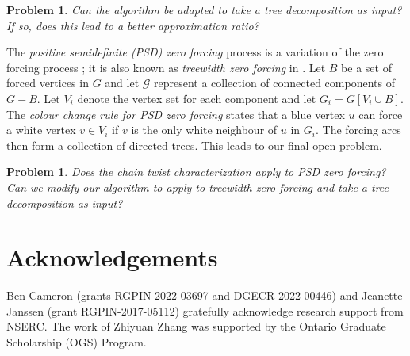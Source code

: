 \documentclass[12pt]{amsart}
\theoremstyle{plain}
\newtheorem{problem}[theorem]{Problem}
\theoremstyle{definition}
\begin{document}
\begin{problem}
  Can the algorithm be adapted to take a tree decomposition as input? If so, does this lead to a better approximation ratio?  
\end{problem}

The {\em positive semidefinite (PSD) zero forcing} process is a variation of the zero forcing process \cite{barioli2008zero}; it is also known as \emph{treewidth zero forcing} in \cite{mitchell2015zero}. 
Let $B$ be a set of forced vertices in $G$ and let $\mathcal G$ represent a collection of connected components of $G-B$. 
Let $V_i$ denote the vertex set for each component and let $G_i = G[V_i\cup B]$. 
The {\em colour change rule for PSD zero forcing} states that a blue vertex $u$ can force a white vertex $v\in V_i$ if $v$ is the only white neighbour of $u$ in $G_i$. 
The forcing arcs then form a collection of directed trees. 
This leads to our final open problem.

\begin{problem}
    Does the chain twist characterization apply to PSD zero forcing?
    Can we modify our algorithm to apply to treewidth zero forcing and take a tree decomposition as input? 
\end{problem}
 


\section*{Acknowledgements}

Ben Cameron (grants RGPIN-2022-03697 and DGECR-2022-00446) and Jeanette Janssen (grant RGPIN-2017-05112) gratefully acknowledge research support from NSERC. The work of Zhiyuan Zhang was supported by the Ontario Graduate Scholarship (OGS) Program. 






\end{document}
